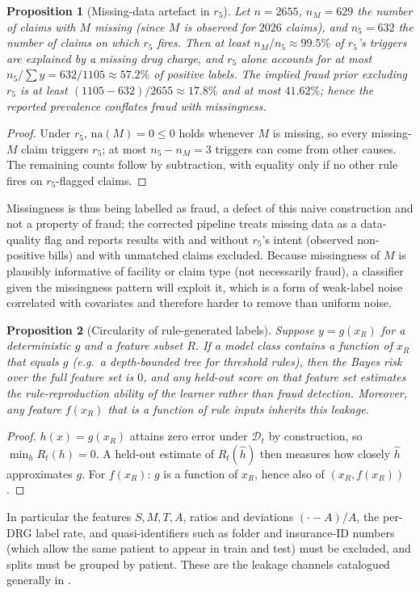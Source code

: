 \documentclass[journal]{IEEEtran}
\newtheorem{proposition}{Proposition}
\newcommand{\1}{\mathbf{1}}
\begin{document}
\begin{proposition}[Missing-data artefact in $r_5$]\label{prop:missing}
Let $n=2655$, $n_M=629$ the number of claims with $M$ missing (since $M$ is observed for $2026$ claims), and $n_5=632$ the number of claims on which $r_5$ fires. Then at least $n_M/n_5\approx99.5\%$ of $r_5$'s triggers are explained by a missing drug charge, and $r_5$ alone accounts for at most $n_5/\!\sum y=632/1105\approx57.2\%$ of positive labels. The implied fraud prior excluding $r_5$ is at least $(1105-632)/2655\approx17.8\%$ and at most $41.62\%$; hence the reported prevalence conflates fraud with missingness.
\end{proposition}
\begin{proof}
Under $r_5$, $\mathrm{na}(M)=0\le0$ holds whenever $M$ is missing, so every missing-$M$ claim triggers $r_5$; at most $n_5-n_M=3$ triggers can come from other causes. The remaining counts follow by subtraction, with equality only if no other rule fires on $r_5$-flagged claims. \end{proof}
Missingness is thus being labelled as fraud, a defect of this naive construction and not a property of fraud; the corrected pipeline treats missing data as a data-quality flag and reports results with and without $r_5$'s intent (observed non-positive bills) and with unmatched claims excluded. Because missingness of $M$ is plausibly informative of facility or claim type (not necessarily fraud), a classifier given the missingness pattern will exploit it, which is a form of weak-label noise \cite{ratner2016dataprogramming,song2022noisy} correlated with covariates and therefore harder to remove than uniform noise.

\begin{proposition}[Circularity of rule-generated labels]\label{prop:circ}
Suppose $y=g(x_R)$ for a deterministic $g$ and a feature subset $R$. If a model class contains a function of $x_R$ that equals $g$ (e.g.\ a depth-bounded tree for threshold rules), then the Bayes risk over the full feature set is $0$, and any held-out score on that feature set estimates the \emph{rule-reproduction} ability of the learner rather than fraud detection. Moreover, any feature $f(x_R)$ that is a function of rule inputs inherits this leakage.
\end{proposition}
\begin{proof}
$h(x)=g(x_R)$ attains zero error under $\mathcal D_t$ by construction, so $\min_h R_t(h)=0$. A held-out estimate of $R_t(\hat h)$ then measures how closely $\hat h$ approximates $g$. For $f(x_R)$: $g$ is a function of $x_R$, hence also of $(x_R, f(x_R))$. \end{proof}
\noindent In particular the features $S,M,T,A$, ratios and deviations $(\cdot-A)/A$, the per-DRG label rate, and quasi-identifiers such as folder and insurance-ID numbers (which allow the same patient to appear in train and test) must be excluded, and splits must be grouped by patient. These are the leakage channels catalogued generally in \cite{kapoor2023leakage,kaufman2012leakage}.
\end{document}
